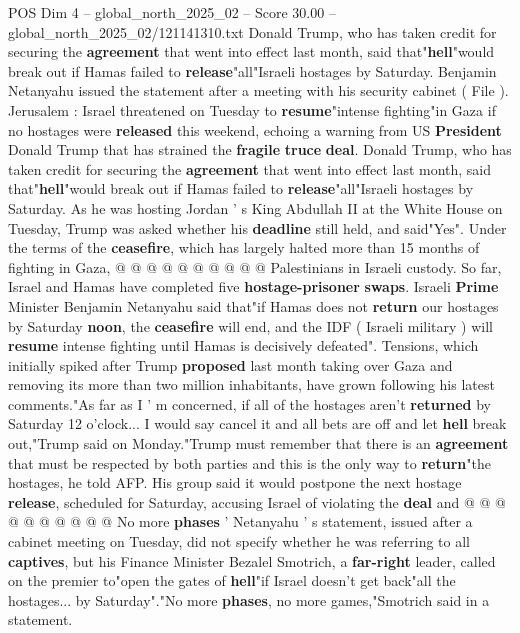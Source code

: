 \begin{textsample}{POS Dim 4 – global\_north\_2025\_02 – Score 30.00 – global\_north\_2025\_02/121141310.txt}  \label{ex:f4_pos_052}
Donald Trump, who has taken credit for securing the \textbf{agreement} that went into effect last month, said that"\textbf{hell}"would break out if Hamas failed to \textbf{release}"all"Israeli hostages by Saturday.
Benjamin Netanyahu issued the statement after a meeting with his security cabinet ( File ).
Jerusalem : Israel threatened on Tuesday to \textbf{resume}"intense fighting"in Gaza if no hostages were \textbf{released} this weekend, echoing a warning from US \textbf{President} Donald Trump that has strained the \textbf{fragile} \textbf{truce} \textbf{deal}.
Donald Trump, who has taken credit for securing the \textbf{agreement} that went into effect last month, said that"\textbf{hell}"would break out if Hamas failed to \textbf{release}"all"Israeli hostages by Saturday.
As he was hosting Jordan ' s King Abdullah II at the White House on Tuesday, Trump was asked whether his \textbf{deadline} still held, and said"Yes".
Under the terms of the \textbf{ceasefire}, which has largely halted more than 15 months of fighting in Gaza, @ @ @ @ @ @ @ @ @ @ Palestinians in Israeli custody.
So far, Israel and Hamas have completed five \textbf{hostage-prisoner} \textbf{swaps}.
Israeli \textbf{Prime} Minister Benjamin Netanyahu said that"if Hamas does not \textbf{return} our hostages by Saturday \textbf{noon}, the \textbf{ceasefire} will end, and the IDF ( Israeli military ) will \textbf{resume} intense fighting until Hamas is decisively defeated".
Tensions, which initially spiked after Trump \textbf{proposed} last month taking over Gaza and removing its more than two million inhabitants, have grown following his latest comments."As far as I ' m concerned, if all of the hostages aren't \textbf{returned} by Saturday 12 o'clock...
I would say cancel it and all bets are off and let \textbf{hell} break out,"Trump said on Monday."Trump must remember that there is an \textbf{agreement} that must be respected by both parties and this is the only way to \textbf{return}"the hostages, he told AFP.
His group said it would postpone the next hostage \textbf{release}, scheduled for Saturday, accusing Israel of violating the \textbf{deal} and @ @ @ @ @ @ @ @ @ @ No more \textbf{phases} ' Netanyahu ' s statement, issued after a cabinet meeting on Tuesday, did not specify whether he was referring to all \textbf{captives}, but his Finance Minister Bezalel Smotrich, a \textbf{far-right} leader, called on the premier to"open the gates of \textbf{hell}"if Israel doesn't get back"all the hostages... by Saturday"."No more \textbf{phases}, no more games,"Smotrich said in a statement.

\end{textsample}
